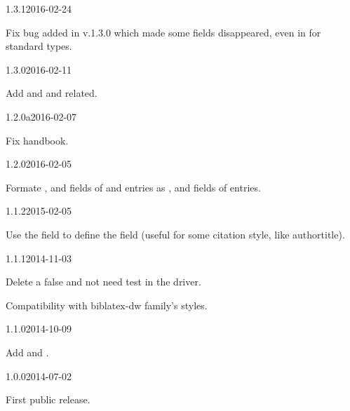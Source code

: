 \documentclass{ltxdockit}[2011/03/25]
\begin{document}
\begin{changelog}

\begin{release}{1.3.1}{2016-02-24}
\item Fix bug added in v.1.3.0 which made some fields disappeared, even in for standard types.
\end{release}

\begin{release}{1.3.0}{2016-02-11}
\item Add  and  and related.
\end{release}

\begin{release}{1.2.0a}{2016-02-07}
\item Fix handbook.
\end{release}

\begin{release}{1.2.0}{2016-02-05}
\item Formate   ,  and  fields of   and  entries as ,  and  fields of  entries.
\end{release}

\begin{release}{1.1.2}{2015-02-05}
\item Use the  field to define the  field (useful for some citation style, like authortitle).
\end{release}

\begin{release}{1.1.1}{2014-11-03}
\item Delete a false and not need test in the driver.
\item Compatibility with biblatex-dw family's styles.
\end{release}
\begin{release}{1.1.0}{2014-10-09}
\item Add  and .
\end{release}

\begin{release}{1.0.0}{2014-07-02}
\item First public release.
\end{release}
\end{changelog}
\end{document}
